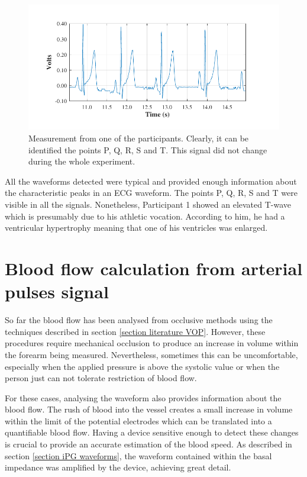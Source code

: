 \begin{figure}[!htbp]
	\centering
	\includegraphics{figure19}    
	\caption[ECG measurement acquired by the system]{Measurement from one of the participants. Clearly, it can be identified the points P, Q, R, S and T. This signal did not change during the whole experiment.}
	\label{fig:ECG}
\end{figure} 

All the waveforms detected were typical and provided enough information about the characteristic peaks in an ECG waveform. The points P, Q, R, S and T were visible in all the signals. Nonetheless, Participant 1 showed an elevated T-wave which is presumably due to his athletic vocation. According to him, he had a ventricular hypertrophy meaning that one of his ventricles was enlarged.  

\section{Blood flow calculation from arterial pulses signal}
\label{section apa flow arterial pulses}
So far the blood flow has been analysed from occlusive methods using the techniques described in section \ref{section literature VOP}. However, these procedures require mechanical occlusion to produce an increase in volume within the forearm being measured. Nevertheless, sometimes this can be uncomfortable, especially when the applied pressure is above the systolic value or when the person just can not tolerate restriction of blood flow.

For these cases, analysing the waveform also provides information about the blood flow. The rush of blood into the vessel creates a small increase in volume within the limit of the potential electrodes which can be translated into a quantifiable blood flow. Having a device sensitive enough to detect these changes is crucial to provide an accurate estimation of the blood speed. As described in section \ref{section iPG waveforms}, the waveform contained within the basal impedance was amplified by the device, achieving great detail.

